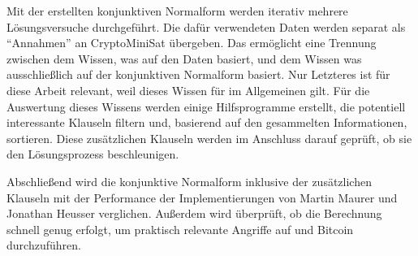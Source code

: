Mit der erstellten konjunktiven Normalform werden iterativ mehrere Lösungsversuche durchgeführt. Die dafür verwendeten
Daten werden separat als "`Annahmen"' an CryptoMiniSat übergeben. Das ermöglicht eine Trennung zwischen dem Wissen, was
auf den Daten basiert, und dem Wissen was ausschließlich auf der konjunktiven Normalform basiert. Nur Letzteres ist für
diese Arbeit relevant, weil dieses Wissen für  im Allgemeinen gilt. Für die Auswertung dieses Wissens werden einige
Hilfsprogramme erstellt, die potentiell interessante Klauseln filtern und, basierend auf den gesammelten Informationen,
sortieren. Diese zusätzlichen Klauseln werden im Anschluss darauf geprüft, ob sie den Lösungsprozess beschleunigen.

Abschließend wird die konjunktive Normalform inklusive der zusätzlichen Klauseln mit der Performance der Implementierungen
von Martin Maurer und Jonathan Heusser verglichen. Außerdem wird überprüft, ob die Berechnung schnell genug erfolgt, um
praktisch relevante Angriffe auf  und Bitcoin durchzuführen.